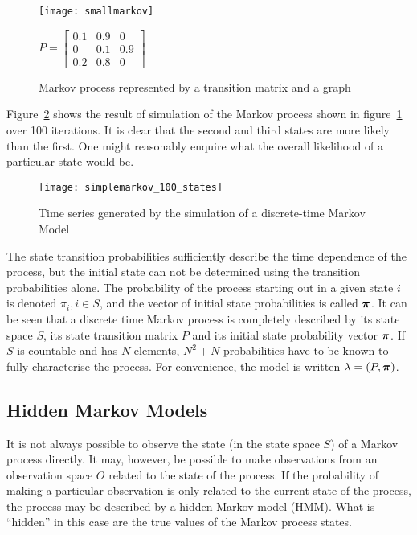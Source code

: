\begin{figure}[htbp]
  \centering
  \begin{minipage}{0.4\textwidth}
    \texttt{[image: smallmarkov]}
  \end{minipage}
  \begin{minipage}{0.4\textwidth}
   $\displaystyle P = \left [ 
      \begin{array}{ccc} 
        0.1 & 0.9 & 0 \\ 
        0 & 0.1 & 0.9 \\ 
        0.2 & 0.8 & 0 
      \end{array} \right ]$
  \end{minipage}
  \caption{Markov process represented by a transition matrix and a graph}
  \label{fig:markovgraph}
\end{figure}

Figure~\ref{fig:markovtimeseries} shows the result of simulation of the Markov process shown in figure~\ref{fig:markovgraph} over 100 iterations.  
It is clear that the second and third states are more likely than the first.
One might reasonably enquire what the overall likelihood of a particular state would be. 

\begin{figure}[htbp]
  \centering
  \texttt{[image: simplemarkov\_100\_states]}
  \caption{Time series generated by the simulation of a discrete-time Markov Model}
  \label{fig:markovtimeseries}
\end{figure}

The state transition probabilities sufficiently describe the time dependence of the process, but the initial state can not be determined using the transition probabilities alone.
The probability of the process starting out in a given state $i$ is denoted $\pi_i, i \in S$, and the vector of initial state probabilities is called
$\boldsymbol{\pi}$.
It can be seen that a discrete time Markov process is completely described by its state space $S$, its state transition matrix $P$ and its initial state probability vector $\boldsymbol{\pi}$.  
If $S$ is countable and has $N$ elements, $N^2 + N$ probabilities have to be known to fully characterise the process.
For convenience, the model is written $\lambda = (P, \boldsymbol{\pi})$.

\subsection{Hidden Markov Models} 
It is not always possible to observe the state (in the state space
$S$) of a Markov process directly. It may, however, be possible to
make observations from an observation space $O$ related to the state
of the process. If the probability of making a particular observation
is only related to the current state of the process, the process may
be described by a hidden Markov model (HMM). What is ``hidden'' in
this case are the true values of the Markov process states.

